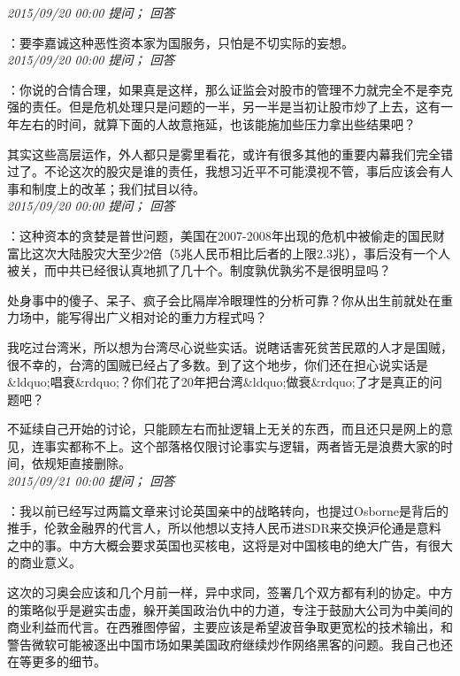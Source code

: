 \documentclass[twocolumn]{ctexart}
\begin{document}
\textit{\hfill\noindent\small 2015/09/20 00:00 提问； 回答}

：要李嘉诚这种恶性资本家为国服务，只怕是不切实际的妄想。\\

\textit{\hfill\noindent\small 2015/09/20 00:00 提问； 回答}

：你说的合情合理，如果真是这样，那么证监会对股市的管理不力就完全不是李克强的责任。但是危机处理只是问题的一半，另一半是当初让股市炒了上去，这有一年左右的时间，就算下面的人故意拖延，也该能施加些压力拿出些结果吧？

其实这些高层运作，外人都只是雾里看花，或许有很多其他的重要内幕我们完全错过了。不论这次的股灾是谁的责任，我想习近平不可能漠视不管，事后应该会有人事和制度上的改革；我们拭目以待。\\

\textit{\hfill\noindent\small 2015/09/20 00:00 提问； 回答}

：这种资本的贪婪是普世问题，美国在2007-2008年出现的危机中被偷走的国民财富比这次大陆股灾大至少2倍（5兆人民币相比后者的上限2.3兆），事后没有一个人被关，而中共已经很认真地抓了几十个。制度孰优孰劣不是很明显吗？

处身事中的傻子、呆子、疯子会比隔岸冷眼理性的分析可靠？你从出生前就处在重力场中，能写得出广义相对论的重力方程式吗？

我吃过台湾米，所以想为台湾尽心说些实话。说瞎话害死贫苦民眾的人才是国贼，很不幸的，台湾的国贼已经占了多数。到了这个地步，你们还在担心说实话是\&ldquo;唱衰\&rdquo;？你们花了20年把台湾\&ldquo;做衰\&rdquo;了才是真正的问题吧？

不延续自己开始的讨论，只能顾左右而扯逻辑上无关的东西，而且还只是网上的意见，连事实都称不上。这个部落格仅限讨论事实与逻辑，两者皆无是浪费大家的时间，依规矩直接删除。\\

\textit{\hfill\noindent\small 2015/09/21 00:00 提问； 回答}

：我以前已经写过两篇文章来讨论英国亲中的战略转向，也提过Osborne是背后的推手，伦敦金融界的代言人，所以他想以支持人民币进SDR来交换沪伦通是意料之中的事。中方大概会要求英国也买核电，这将是对中国核电的绝大广告，有很大的商业意义。

这次的习奥会应该和几个月前一样，异中求同，签署几个双方都有利的协定。中方的策略似乎是避实击虚，躲开美国政治仇中的力道，专注于鼓励大公司为中美间的商业利益而代言。在西雅图停留，主要应该是希望波音争取更宽松的技术输出，和警告微软可能被逐出中国市场如果美国政府继续炒作网络黑客的问题。我自己也还在等更多的细节。\\
\end{document}
